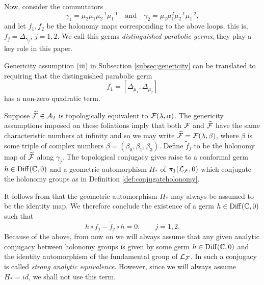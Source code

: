 Now, consider the commutators
\begin{equation}\label{def:gamma_i}
 \gamma_1=\mu_2\mu_1\mu_2^{-1}\mu_1^{-1} \quad\text{and}\quad \gamma_2=\mu_2\mu_1^2\mu_2^{-1}\mu_1^{-2}, 
\end{equation}
and let $f_1,f_2$ be the holonomy maps corresponding to the above loops, this is, $f_j=\Delta_{\gamma_j}$, $j=1,2$. We call this germs \emph{distinguished parabolic germs}; they play a key role in this paper.

\begin{remark}\label{rmk:genericity(iii)}
Genericity assumption (iii) in Subsection \ref{subsec:genericity} can be translated to requiring that the distinguished parabolic germ 
\[f_1=[\Delta_{\mu_1},\Delta_{\mu_2}]\]
has a non-zero quadratic term. 
\end{remark}

Suppose $\widetilde{\mathcal{F}}\in\mathcal{A}_2$ is topologically equivalent to $\mathcal{F}(\lambda,\alpha)$. The genericity assumptions imposed on these foliations imply that both $\mathcal{F}$ and $\widetilde{\mathcal{F}}$ have the same characteristic numbers at infinity and so we may write $\widetilde{\mathcal{F}}=\mathcal{F}(\lambda,\beta)$, where $\beta$ is some triple of complex numbers $\beta=(\beta_0,\beta_1,\beta_3)$. Define $\tilde{f}_j$ to be the holonomy map of $\widetilde{\mathcal{F}}$ along $\gamma_j$. The topological conjugacy gives raise to a conformal germ $h\in\operatorname{Diff}(\mathbb{C},0)$ and a geometric automorphism $H_\ast$ of $\pi_1(\mathcal{L}_{\mathcal{F}},0)$ which conjugate the holonomy groups as in Definition \ref{def:conjugateholonomy}. 

\begin{remark}\label{rmk:strongae}
It follows from \cite{StrongTopoInvariance} that the geometric automorphism $H_\ast$ may always be assumed to be the identity map. We therefore conclude the existence of a germ $h\in\operatorname{Diff}(\mathbb{C},0)$ such that
\begin{equation}\label{eq:conjugatef-structure}
 h\circ f_j-\tilde{f}_j\circ h=0, \qquad j=1,2.
\end{equation}
Because of the above, from now on we will always assume that any given analytic conjugacy between holonomy groups is given by some germ $h\in\operatorname{Diff}(\mathbb{C},0)$ and the identity automorphism of the fundamental group of $\mathcal{L}_{\mathcal{F}}$. In \cite{StrongTopoInvariance} such a conjugacy is called \emph{strong analytic equivalence}. However, since we will always assume $H_\ast=id$, we shall not use this term.
\end{remark}

